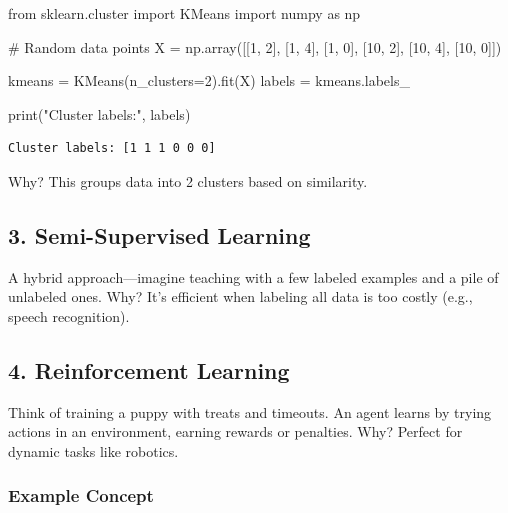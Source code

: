 \documentclass[
  letterpaper,
  DIV=11,
  numbers=noendperiod]{scrreprt}
\newenvironment{Shaded}{\begin{snugshade}}{\end{snugshade}}
\newcommand{\BuiltInTok}[1]{\textcolor[rgb]{0.00,0.23,0.31}{#1}}
\newcommand{\CommentTok}[1]{\textcolor[rgb]{0.37,0.37,0.37}{#1}}
\newcommand{\DecValTok}[1]{\textcolor[rgb]{0.68,0.00,0.00}{#1}}
\newcommand{\ImportTok}[1]{\textcolor[rgb]{0.00,0.46,0.62}{#1}}
\newcommand{\NormalTok}[1]{\textcolor[rgb]{0.00,0.23,0.31}{#1}}
\newcommand{\OperatorTok}[1]{\textcolor[rgb]{0.37,0.37,0.37}{#1}}
\newcommand{\StringTok}[1]{\textcolor[rgb]{0.13,0.47,0.30}{#1}}
\begin{document}
\begin{Shaded}
\begin{Highlighting}[]
\ImportTok{from}\NormalTok{ sklearn.cluster }\ImportTok{import}\NormalTok{ KMeans}
\ImportTok{import}\NormalTok{ numpy }\ImportTok{as}\NormalTok{ np}

\CommentTok{\# Random data points}
\NormalTok{X }\OperatorTok{=}\NormalTok{ np.array([[}\DecValTok{1}\NormalTok{, }\DecValTok{2}\NormalTok{], [}\DecValTok{1}\NormalTok{, }\DecValTok{4}\NormalTok{], [}\DecValTok{1}\NormalTok{, }\DecValTok{0}\NormalTok{], [}\DecValTok{10}\NormalTok{, }\DecValTok{2}\NormalTok{], [}\DecValTok{10}\NormalTok{, }\DecValTok{4}\NormalTok{], [}\DecValTok{10}\NormalTok{, }\DecValTok{0}\NormalTok{]])}

\NormalTok{kmeans }\OperatorTok{=}\NormalTok{ KMeans(n\_clusters}\OperatorTok{=}\DecValTok{2}\NormalTok{).fit(X)}
\NormalTok{labels }\OperatorTok{=}\NormalTok{ kmeans.labels\_}

\BuiltInTok{print}\NormalTok{(}\StringTok{"Cluster labels:"}\NormalTok{, labels)}
\end{Highlighting}
\end{Shaded}

\begin{verbatim}
Cluster labels: [1 1 1 0 0 0]
\end{verbatim}

Why? This groups data into 2 clusters based on similarity.

\subsection{3. Semi-Supervised Learning}\label{semi-supervised-learning}

A hybrid approach---imagine teaching with a few labeled examples and a
pile of unlabeled ones. Why? It's efficient when labeling all data is
too costly (e.g., speech recognition).

\subsection{4. Reinforcement Learning}\label{reinforcement-learning}

Think of training a puppy with treats and timeouts. An agent learns by
trying actions in an environment, earning rewards or penalties. Why?
Perfect for dynamic tasks like robotics.

\subsubsection{Example Concept}\label{example-concept}
\end{document}
